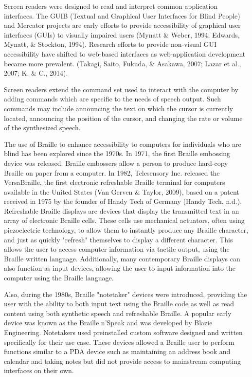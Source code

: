 \documentclass[11.5pt]{sig-alternate} %
\begin{document}
\begin{large}
Screen readers were designed to read and interpret common application interfaces. The GUIB (Textual and Graphical User Interfaces for Blind People) and Mercator projects are early efforts to provide accessibility of graphical user interfaces (GUIs) to visually impaired users (Mynatt \& Weber, 1994; Edwards, Mynatt, \& Stockton, 1994). Research efforts to provide non-visual GUI accessibility have shifted to web-based interfaces as web-application development became more prevalent. (Takagi, Saito, Fukuda, \& Asakawa, 2007; Lazar et al., 2007; K. \& C., 2014).

Screen readers extend the command set used to interact with the computer by adding commands which are specific to the needs of speech output. Such commands may include announcing the text on which the cursor is currently located, announcing the position of the cursor, and changing the rate or volume of the synthesized speech.

The use of Braille to enhance accessibility to computers for individuals who are blind has been explored since the 1970s. In 1971, the first Braille embossing device was released. Braille embossers allow a person to produce hard-copy Braille on paper from a computer. In 1982, Telesensory Inc. released the VersaBraille, the first electronic refreshable Braille terminal for computers available in the United States (Van Gerven \& Taylor, 2009), based on a patent received in 1975 by the founder of Handy Tech of Germany (Handy Tech, n.d.). Refreshable Braille displays are devices that display the transmitted text in an array of electronic Braille cells. These cells use mechanical actuators, often using piezoelectric technology, to allow them to instantly produce any Braille character, and just as quickly "refresh" themselves to display a different character. This allows the user to access computer information via tactile output, using the Braille written language. Additionally, many contemporary Braille displays can also function as input devices, allowing the user to input information into the computer using the Braille language.

Also, during the 1980s, Braille "notetaker" devices were introduced, providing the user with the ability to both input text using the Braille code as well as read content using both synthetic speech and refreshable Braille. A popular early device was known as the Braille n’Speak and was developed by Blazie Engineering. Notetakers used preinstalled custom software designed and written specifically for their use case. These devices allowed a Braille user to perform functions similar to a PDA device such as maintaining an address book and calendar and taking notes but did not provide access to mainstream computing interfaces on their own.


\end{large}
\end{document}
